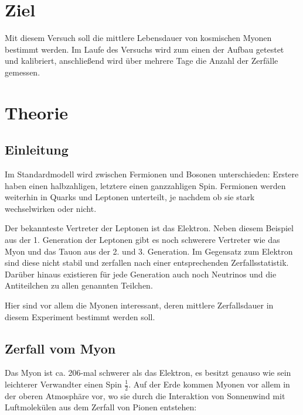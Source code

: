 

\section{Ziel}
Mit diesem Versuch soll die mittlere Lebensdauer von kosmischen Myonen bestimmt werden. Im Laufe des Versuchs wird zum einen der Aufbau getestet und kalibriert, anschließend wird über mehrere Tage die Anzahl der Zerfälle gemessen.

\section{Theorie}
\subsection{Einleitung}
Im Standardmodell wird zwischen Fermionen und Bosonen unterschieden: Erstere haben einen halbzahligen, letztere einen ganzzahligen Spin. Fermionen werden weiterhin in Quarks und Leptonen unterteilt, je nachdem ob sie stark wechselwirken oder nicht. 

Der bekannteste Vertreter der Leptonen ist das Elektron. Neben diesem Beispiel aus der 1. Generation der Leptonen gibt es noch schwerere Vertreter wie das Myon und das Tauon aus der 2. und 3. Generation. Im Gegensatz zum Elektron sind diese nicht stabil und zerfallen nach einer entsprechenden Zerfallsstatistik. Dar\"uber hinaus existieren f\"ur jede Generation auch noch Neutrinos und die Antiteilchen zu allen genannten Teilchen.

Hier sind vor allem die Myonen interessant, deren mittlere Zerfallsdauer in diesem Experiment bestimmt werden soll.

\subsection{Zerfall vom Myon}
Das Myon ist ca. 206-mal schwerer als das Elektron, es besitzt genauso wie sein leichterer Verwandter einen Spin $\frac{1}{2}$. Auf der Erde kommen Myonen vor allem in der oberen Atmosph\"are vor, wo sie durch die Interaktion von Sonnenwind mit Luftmolekülen aus dem Zerfall von Pionen entstehen:

